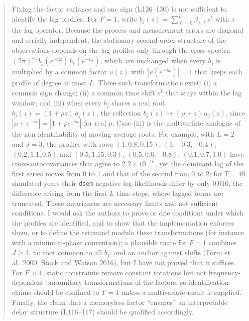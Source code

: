 \documentclass[11pt]{article}
\begin{document}
\begin{quote}
Fixing the factor variance and one sign (L126--130) is not sufficient to
identify the lag profiles. For \(F = 1\), write
\(b_j(z) = \sum_{\ell=0}^{L} \beta_{j,\ell} z^{\ell}\) with \(z\) the
lag operator. Because the process and measurement errors are diagonal
and serially independent, the stationary second-order structure of the
observations depends on the lag profiles only through the cross-spectra
\((2\pi)^{-1} b_j(e^{-i\omega})\,\overline{b_k(e^{-i\omega})}\), which
are unchanged when every \(b_j\) is multiplied by a common factor
\(u(z)\) with \(|u(e^{-i\omega})| = 1\) that keeps each profile of
degree at most \(L\). Three such transformations exist: (i) a common
sign change; (ii) a common time shift \(z^{k}\) that stays within the
lag window; and (iii) when every \(b_j\) shares a real root,
\(b_j(z) = (1 + \rho z)\,a_j(z)\), the reflection
\(b_j(z) \mapsto (\rho + z)\,a_j(z)\), since
\(|\rho + e^{-i\omega}| = |1 + \rho e^{-i\omega}|\) for real \(\rho\).
Case (iii) is the multivariate analogue of the non-identifiability of
moving-average roots. For example, with \(L = 2\) and \(J = 3\), the
profiles with rows \((1, 0.8, 0.15)\), \((1, -0.3, -0.4)\),
\((0.2, 1.1, 0.5)\) and \((0.5, 1.15, 0.3)\), \((0.5, 0.6, -0.8)\),
\((0.1, 0.7, 1.0)\) have cross-autocovariances that agree to
\(2.2 \times 10^{-16}\), yet the dominant lag of the first series moves
from 0 to 1 and that of the second from 0 to 2; for \(T = 40\) simulated
years their \texttt{dsem} negative log-likelihoods differ by only 0.016,
the difference arising from the first \(L\) time steps, where lagged
terms are truncated. These invariances are necessary limits and not
sufficient conditions. I would ask the authors to prove or cite
conditions under which the profiles are identified, and to show that the
implementation enforces them, or to define the estimand modulo these
transformations (for instance with a minimum-phase convention); a
plausible route for \(F = 1\) combines \(J \ge 3\), no root common to
all \(b_j\), and an anchor against shifts (Forni et al.~2000; Stock and
Watson 2016), but I have not proved that it suffices. For \(F > 1\),
static constraints remove constant rotations but not frequency-dependent
paraunitary transformations of the factors, so identification claims
should be confined to \(F = 1\) unless a multivariate result is
supplied. Finally, the claim that a memoryless factor ``ensures'' an
interpretable delay structure (L116--117) should be qualified
accordingly.
\end{quote}
\end{document}
